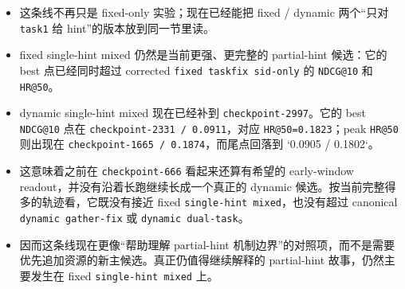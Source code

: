 \begin{itemize}
\item 这条线不再只是 fixed-only 实验；现在已经能把 fixed / dynamic 两个“只对 \texttt{task1} 给 hint”的版本放到同一节里读。
\item fixed single-hint mixed 仍然是当前更强、更完整的 partial-hint 候选：它的 best 点已经同时超过 corrected \texttt{fixed taskfix sid-only} 的 \texttt{NDCG@10} 和 \texttt{HR@50}。
\item dynamic single-hint mixed 现在已经补到 \texttt{checkpoint-2997}。它的 best \texttt{NDCG@10} 点在 \texttt{checkpoint-2331 / 0.0911}，对应 \texttt{HR@50=0.1823}；peak \texttt{HR@50} 则出现在 \texttt{checkpoint-1665 / 0.1874}，而尾点回落到 `0.0905 / 0.1802`。
\item 这意味着之前在 \texttt{checkpoint-666} 看起来还算有希望的 early-window readout，并没有沿着长跑继续长成一个真正的 dynamic 候选。按当前完整得多的轨迹看，它既没有接近 fixed \texttt{single-hint mixed}，也没有超过 canonical \texttt{dynamic gather-fix} 或 \texttt{dynamic dual-task}。
\item 因而这条线现在更像“帮助理解 partial-hint 机制边界”的对照项，而不是需要优先追加资源的新主候选。真正仍值得继续解释的 partial-hint 故事，仍然主要发生在 fixed \texttt{single-hint mixed} 上。
\end{itemize}
